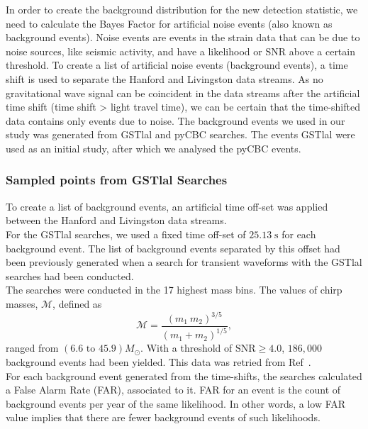 \documentclass{article}
\begin{document}
   
 
 
 In order to create the background distribution for the new detection statistic, we need to calculate the Bayes Factor for artificial noise events (also known as background events). Noise events are events in the strain data that can be due to noise sources, like seismic activity, and have a likelihood or SNR above a certain threshold. To create a list of artificial noise events (background events),  a time shift is used to separate the Hanford and Livingston data streams. As no gravitational wave signal can be coincident in the data streams after the artificial time shift (time shift > light travel time), we can be certain that the time-shifted data contains only events due to noise. The background events we used in our study was generated from GSTlal and pyCBC searches. The events GSTlal were used as an initial study, after which we analysed the pyCBC events.\\
 
 



\subsubsection{Sampled points from GSTlal Searches} \label{appendixGstlalandPycbc}


To create a list of background events, an artificial time off-set was applied between the Hanford and Livingston data streams.\\

For the GSTlal searches, we used a fixed time off-set of $25.13 \; \mathrm{s}$ for each background event. The list of background events separated by this offset had been previously generated when a search for transient waveforms with the GSTlal searches had been conducted. \\

The searches were conducted in the 17 highest mass bins. The values of chirp masses, $\mathcal{M}$, defined as $$\mathcal{M} = \frac{(m_1 \ m_2)^{3/5}}{(m_1 + m_2)^{1/5}},$$ ranged from $(6.6  \text{ to } 45.9) M_{\odot}$. With a threshold of $\text{SNR} \geq 4.0$, $186,000$ background events had been yielded. This data was retried from Ref~\cite{GSTlal}.\\


  For each background event generated from the time-shifts, the searches calculated a False Alarm Rate (FAR), associated to it. FAR for an event is the count of background events per year of the same likelihood. In other words, a low FAR value implies that there are fewer background events of such likelihoods. \\
  
\end{document}
